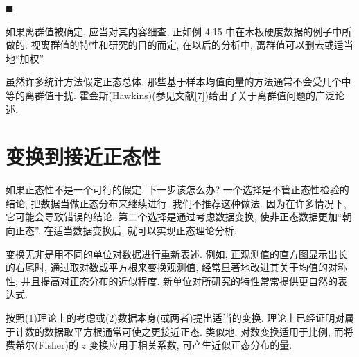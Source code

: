 
\begin{mvfigure}
\label{fig:4.11}
\end{mvfigure}
\hfill$\blacksquare$

如果离群值被确定, 应当对其内容细查, 正如例 4.15 中在木板硬度数据的例子中所做的. 视离群值的特性和研究的目的而定, 在以后的分析中, 离群值可以删去或适当地“加权”.

虽然许多统计方法假定正态总体, 那些基于样本均值向量的方法通常不会受几个中等的离群值干扰. 霍金斯(Hawkins)(参见文献[7])给出了关于离群值问题的广泛论述.

\section{变换到接近正态性}  %
\label{sec:4.8}

如果正态性不是一个可行的假定, 下一步该怎么办? 一个选择是不管正态性检验的结论, 把数据当做正态分布来继续进行. 我们不推荐这种做法. 因为在许多情况下, 它可能会导致错误的结论. 第二个选择是通过考虑数据变换, 使非正态数据更加“朝向正态”. 在适当数据变换后, 就可以实现正态理论分析.

变换无非是用不同的单位对数据进行重新表述. 例如, 正观测值的直方图显示出长的右尾时, 通过取对数或平方根来变换观测值, 经常显著地改进其关于均值的对称性, 并且提高对正态分布的近似程度. 新单位对所研究的特性常常提供更自然的表达式.

按照(1)理论上的考虑或(2)数据本身(或两者)提出适当的变换. 理论上已经证明对属于计数的数据取平方根通常可使之更接近正态. 类似地, 对数变换适用于比例, 而将费希尔(Fisher)的 $z$ 变换应用于相关系数, 可产生近似正态分布的量.

